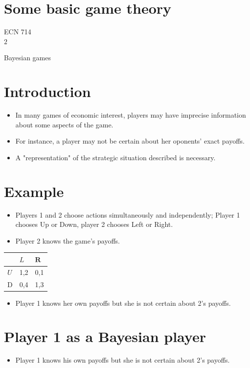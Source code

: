 \documentclass[10pt]{article}
\begin{document}
\section*{Some basic game theory}
ECN 714\\
$2$

Bayesian games

\section*{Introduction}
\begin{itemize}
  \item In many games of economic interest, players may have imprecise information about some aspects of the game.
  \item For instance, a player may not be certain about her oponents' exact payoffs.
  \item A "representation" of the strategic situation described is necessary.
\end{itemize}

\section*{Example}
\begin{itemize}
  \item Players 1 and 2 choose actions simultaneously and independently; Player 1 chooses Up or Down, player 2 chooses Left or Right.
  \item Player 2 knows the game's payoffs.
\end{itemize}

\begin{center}
\begin{tabular}{lll}
 & $L$ & $\mathbf{R}$ \\
\hline
$U$ & 1,2 & 0,1 \\
\hline
D & 0,4 & 1,3 \\
\hline
\end{tabular}
\end{center}

\begin{itemize}
  \item Player 1 knows her own payoffs but she is not certain about 2's payoffs.
\end{itemize}

\section*{Player 1 as a Bayesian player}
\begin{itemize}
  \item Player 1 knows his own payoffs but she is not certain about 2's payoffs.
\end{itemize}
\end{document}

